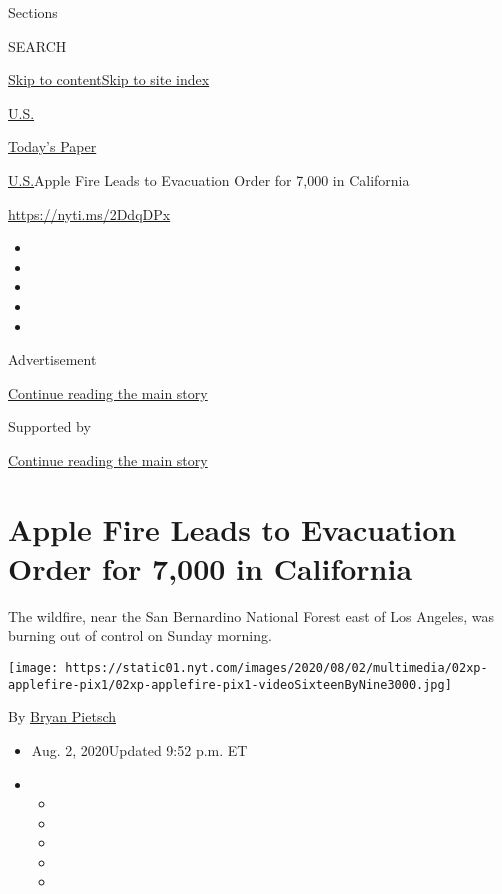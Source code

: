 Sections

SEARCH

\protect\hyperlink{site-content}{Skip to
content}\protect\hyperlink{site-index}{Skip to site index}

\href{https://www.nytimes.com/section/us}{U.S.}

\href{https://myaccount.nytimes.com/auth/login?response_type=cookie\&client_id=vi}{}

\href{https://www.nytimes.com/section/todayspaper}{Today's Paper}

\href{/section/us}{U.S.}\textbar{}Apple Fire Leads to Evacuation Order
for 7,000 in California

\url{https://nyti.ms/2DdqDPx}

\begin{itemize}
\item
\item
\item
\item
\item
\end{itemize}

Advertisement

\protect\hyperlink{after-top}{Continue reading the main story}

Supported by

\protect\hyperlink{after-sponsor}{Continue reading the main story}

\hypertarget{apple-fire-leads-to-evacuation-order-for-7000-in-california}{%
\section{Apple Fire Leads to Evacuation Order for 7,000 in
California}\label{apple-fire-leads-to-evacuation-order-for-7000-in-california}}

The wildfire, near the San Bernardino National Forest east of Los
Angeles, was burning out of control on Sunday morning.

\texttt{[image: https://static01.nyt.com/images/2020/08/02/multimedia/02xp-applefire-pix1/02xp-applefire-pix1-videoSixteenByNine3000.jpg]}

By \href{https://www.nytimes.com/by/bryan-pietsch}{Bryan Pietsch}

\begin{itemize}
\item
  Aug. 2, 2020Updated 9:52 p.m. ET
\item
  \begin{itemize}
  \item
  \item
  \item
  \item
  \item
  \end{itemize}
\end{itemize}

